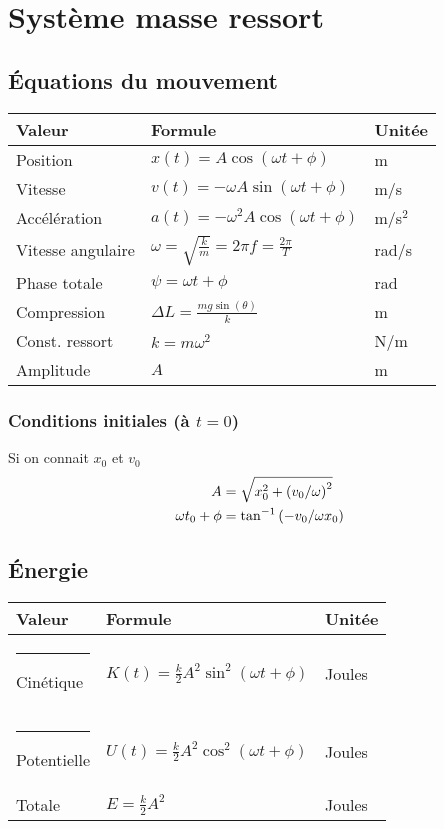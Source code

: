 \section{Système masse ressort}
\raggedright

\subsection{Équations du mouvement}
\begin{tabular}{lll}
Valeur & Formule & Unitée \\\hline
Position & \(x(t)= A\cos (\omega t + \phi)\) & m\\
Vitesse & \(v(t)= -\omega A \sin (\omega t +\phi)\) & m/s\\
Accélération & \(a(t)= -\omega^2 A \cos (\omega t +\phi)\)& m/s$^2$\\\hline
Vitesse angulaire & \(\omega = \sqrt{\frac{k}{m}} = 2\pi f = \frac{2\pi}{T}\) & rad/s \\[8pt]
Phase totale & \(\psi=\omega t +\phi \) & rad \\%
Compression &\(\Delta L = \frac{mg\sin (\theta)}{k} \) & m \\[7pt]\hline\rule{0pt}{10pt}\hspace{-4pt}
Const. ressort & \(k = m\omega^2\) & N/m\\
Amplitude & \(A\) & m\\
\end{tabular}%
\subsubsection{Conditions initiales (à $t=0$)}
Si on connait $x_0$ et $v_0$
\begin{align*}
    A &= \sqrt{x^2_0 + \qty(v_0/\omega)^2}\\
    \omega t_0+\phi &= \tan^{-1}\qty(-v_0/\omega x_0)
\end{align*}

\subsection{Énergie}
\begin{tabular}{lll}
Valeur & Formule & Unitée \\\hline\rule{-3pt}{16pt}
Cinétique & \(K(t)= \frac{k}{2}A^2\sin^2 (\omega t + \phi)\) & Joules\\\rule{-3pt}{16pt}
Potentielle & \(U(t)= \frac{k}{2}A^2 \cos^2 (\omega t +\phi)\) & Joules\\
Totale & \(E= \frac{k}{2} A^2\)& Joules
\end{tabular}%